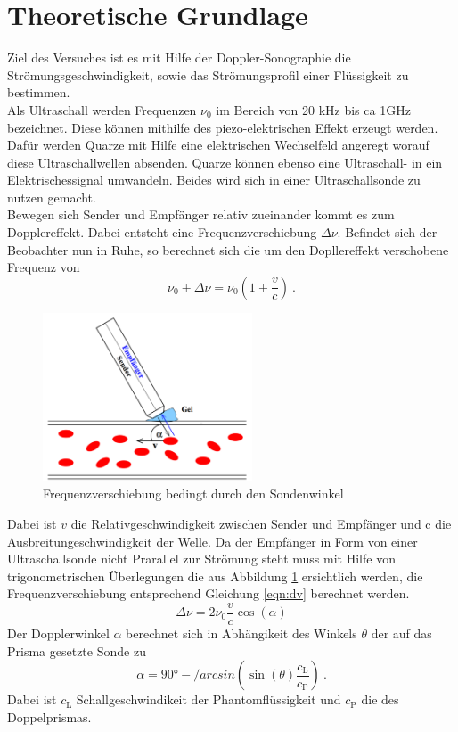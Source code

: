 \section{Theoretische Grundlage}
\label{sec:Theorie}
Ziel des Versuches ist es mit Hilfe der Doppler-Sonographie die Strömungsgeschwindigkeit, sowie das Strömungsprofil einer Flüssigkeit zu bestimmen. 	\\
Als Ultraschall werden Frequenzen $\nu_0$ im Bereich von 20 kHz bis ca 1GHz bezeichnet. Diese können mithilfe des piezo-elektrischen Effekt erzeugt werden. Dafür werden Quarze mit Hilfe eine elektrischen Wechselfeld angeregt worauf diese Ultraschallwellen absenden. Quarze können ebenso eine Ultraschall- in ein Elektrischessignal umwandeln. Beides wird sich in einer Ultraschallsonde zu nutzen gemacht.	\\
Bewegen sich Sender und Empfänger relativ zueinander kommt es zum Dopplereffekt. Dabei entsteht eine Frequenzverschiebung $\Delta \nu$. Befindet sich der Beobachter nun in Ruhe, so berechnet sich die um den Dopllereffekt verschobene Frequenz von 
\begin{equation}
  \nu_0 + \Delta \nu = \nu_0 \left( 1 \pm \frac{v}{c} \right) \ .
  \label{}
\end{equation}
\begin{figure}
  \centering
  \includegraphics[height=5cm]{picture/Doppler.pdf}
  \caption{Frequenzverschiebung bedingt durch den Sondenwinkel}
  \label{fig:dFre}
\end{figure}
Dabei ist $v$ die Relativgeschwindigkeit zwischen Sender und Empfänger und c die Ausbreitungeschwindigkeit der Welle. Da der Empfänger in Form von einer Ultraschallsonde nicht Prarallel zur Strömung steht muss mit Hilfe von trigonometrischen Überlegungen die aus Abbildung \ref{fig:dFre} ersichtlich werden, die Frequenzverschiebung entsprechend Gleichung \eqref{eqn:dv} berechnet werden.
\begin{equation}
  \Delta \nu = 2 \nu_0 \frac{v}{c} \cos (\alpha)
  \label{eqn:dv}
\end{equation}
Der Dopplerwinkel $\alpha$ berechnet sich in Abhängikeit des Winkels $\theta$ der auf das Prisma gesetzte Sonde zu 
\begin{equation}
  \alpha = 90° - /arcsin\left( \sin(\theta) \frac{c_\text{L}}{c_\text{P}} \right) \ .
  \label{eqn:alpha}
\end{equation}
Dabei ist $c_\text{L}$ Schallgeschwindikeit der Phantomflüssigkeit und $c_\text{P}$ die des Doppelprismas. 
